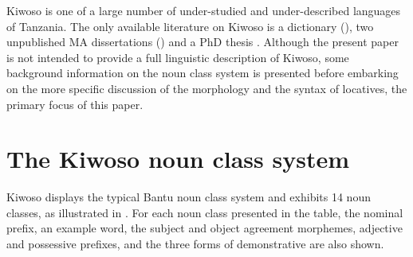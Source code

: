 \documentclass[output=paper]{langscibook}
\begin{document}
Kiwoso is one of a large number of under-studied and under-described languages of Tanzania. The only available literature on Kiwoso is a dictionary (\citealt{KagayaOlomi2009}), two unpublished MA dissertations (\citealt{Mallya2011, Mushi2005}) and a PhD thesis \citep{Mallya2016}. Although the present paper is not intended to provide a full linguistic description of Kiwoso, some background information on the noun class system is presented before embarking on the more specific discussion of the morphology and the syntax of locatives, the primary focus of this paper.

\section{The Kiwoso noun class system}
\label{sec:mallya:3}

Kiwoso displays the typical Bantu noun class system and exhibits 14 noun classes, as illustrated in . For each noun class presented in the table, the nominal prefix, an example word, the subject and object agreement morphemes, adjective and possessive prefixes, and the three forms of demonstrative are also shown.
\end{document}
